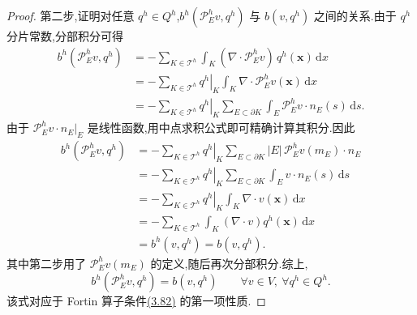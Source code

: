 \begin{proof}
第二步,证明对任意 $q^h\in Q^h$,$b^h(\mathcal{P}_E^h v,q^h)$ 与 $b(v,q^h)$ 之间的关系.由于 $q^h$ 分片常数,分部积分可得
\[
\begin{aligned}
  b^h(\mathcal{P}_E^h v,q^h)
   &=-\sum_{K\in\mathcal{T}^h}
       \int_K(\nabla\cdot\mathcal{P}_E^h v)\,q^h(\bm{x})\,\mathrm{d}x\\
   &=-\sum_{K\in\mathcal{T}^h}
       \left.q^h\right|_K
       \int_K\nabla\cdot\mathcal{P}_E^h v(\bm{x})\,\mathrm{d}x\\
   &=-\sum_{K\in\mathcal{T}^h}
       \left.q^h\right|_K
       \sum_{E\subset\partial K}
       \int_E\mathcal{P}_E^h v\cdot n_E(s)\,\mathrm{d}s.
\end{aligned}
\]
由于 $\mathcal{P}_E^h v\cdot n_E|_E$ 是线性函数,用中点求积公式即可精确计算其积分.因此
\[
\begin{aligned}
  b^h(\mathcal{P}_E^h v,q^h)
   &=-\sum_{K\in\mathcal{T}^h}
       \left.q^h\right|_K
       \sum_{E\subset\partial K}
       |E|\,\mathcal{P}_E^h v(m_E)\cdot n_E\\
   &=-\sum_{K\in\mathcal{T}^h}
       \left.q^h\right|_K
       \sum_{E\subset\partial K}
       \int_E v\cdot n_E(s)\,\mathrm{d}s\\
   &=-\sum_{K\in\mathcal{T}^h}
       \left.q^h\right|_K
       \int_K\nabla\cdot v(\bm{x})\,\mathrm{d}x\\
   &=-\sum_{K\in\mathcal{T}^h}
       \int_K(\nabla\cdot v)q^h(\bm{x})\,\mathrm{d}x\\
   &=b^h(v,q^h)=b(v,q^h).
\end{aligned}
\]
其中第二步用了 $\mathcal{P}_E^h v(m_E)$ 的定义,随后再次分部积分.综上,
\begin{equation}\label{eq:crouzeix-raviart-fortin-identity}
  b^h(\mathcal{P}_E^h v,q^h)=b(v,q^h)
  \qquad\forall v\in V,\ \forall q^h\in Q^h.
\end{equation}
该式对应于 Fortin 算子条件\hyperref[eq:fortin-property]{(3.82)} 的第一项性质.


\end{proof}

